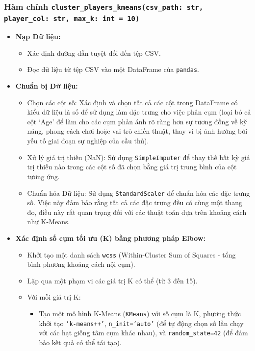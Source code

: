 \documentclass[12pt, a4paper]{report}
\begin{document}
\subsubsection*{Hàm chính \texttt{cluster\_players\_kmeans(csv\_path: str, player\_col: str, max\_k: int = 10)}}
\begin{itemize}
    \item \textbf{Nạp Dữ liệu:}
    \begin{itemize}
        \item Xác định đường dẫn tuyệt đối đến tệp CSV.
        \item Đọc dữ liệu từ tệp CSV vào một DataFrame của \texttt{pandas}.
    \end{itemize}
    \item \textbf{Chuẩn bị Dữ liệu:}
    \begin{itemize}
        \item Chọn các cột số: Xác định và chọn tất cả các cột trong DataFrame có kiểu dữ liệu là số để sử dụng làm đặc trưng cho việc phân cụm (loại bỏ cả cột ‘Age’ để làm cho các cụm phản ánh rõ ràng hơn sự tương đồng về kỹ năng, phong cách chơi hoặc vai trò chiến thuật, thay vì bị ảnh hưởng bởi yếu tố giai đoạn sự nghiệp của cầu thủ).
        \item Xử lý giá trị thiếu (NaN): Sử dụng \texttt{SimpleImputer} để thay thế bất kỳ giá trị thiếu nào trong các cột số đã chọn bằng giá trị trung bình của cột tương ứng.
        \item Chuẩn hóa Dữ liệu: Sử dụng \texttt{StandardScaler} để chuẩn hóa các đặc trưng số. Việc này đảm bảo rằng tất cả các đặc trưng đều có cùng một thang đo, điều này rất quan trọng đối với các thuật toán dựa trên khoảng cách như K-Means.
    \end{itemize}
    \item \textbf{Xác định số cụm tối ưu (K) bằng phương pháp Elbow:}
    \begin{itemize}
        \item Khởi tạo một danh sách \texttt{wcss} (Within-Cluster Sum of Squares - tổng bình phương khoảng cách nội cụm).
        \item Lặp qua một phạm vi các giá trị K có thể (từ 3 đến 15).
        \item Với mỗi giá trị K:
        \begin{itemize}
            \item Tạo một mô hình K-Means (\texttt{KMeans}) với số cụm là K, phương thức khởi tạo \texttt{'k-means++'}, \texttt{n\_init='auto'} (để tự động chọn số lần chạy với các hạt giống tâm cụm khác nhau), và \texttt{random\_state=42} (để đảm bảo kết quả có thể tái tạo).

\end{itemize}
\end{itemize}
\end{itemize}
\end{document}
